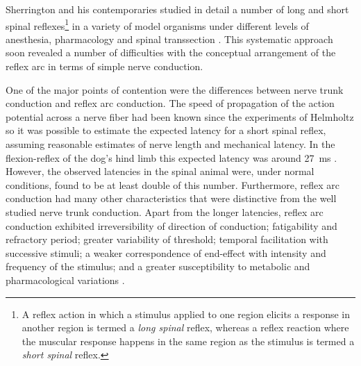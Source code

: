 Sherrington and his contemporaries studied in detail a number of long and short spinal reflexes\footnote{A reflex action in which a stimulus applied to one region elicits a response in another region is termed a \emph{long spinal} reflex, whereas a reflex reaction where the muscular response happens in the same region as the stimulus is termed a \emph{short spinal} reflex.} in a variety of model organisms under different levels of anesthesia, pharmacology and spinal transsection \cite{Sherrington1903}. This systematic approach soon revealed a number of difficulties with the conceptual arrangement of the reflex arc in terms of simple nerve conduction.

One of the major points of contention were the differences between nerve trunk conduction and reflex arc conduction. The speed of propagation of the action potential across a nerve fiber had been known since the experiments of Helmholtz \cite{Helmholtz1850,Schmidgen2002} so it was possible to estimate the expected latency for a short spinal reflex, assuming reasonable estimates of nerve length and mechanical latency. In the flexion-reflex of the dog's hind limb this expected latency was around \SI{27}{\milli\second} \cite[p.19]{Sherrington1906}. However, the observed latencies in the spinal animal were, under normal conditions, found to be at least double of this number. Furthermore, reflex arc conduction had many other characteristics that were distinctive from the well studied nerve trunk conduction. Apart from the longer latencies, reflex arc conduction exhibited irreversibility of direction of conduction; fatigability and refractory period; greater variability of threshold; temporal facilitation with successive stimuli; a weaker correspondence of end-effect with intensity and frequency of the stimulus; and a greater susceptibility to metabolic and pharmacological variations \cite[p.14]{Sherrington1906}.



